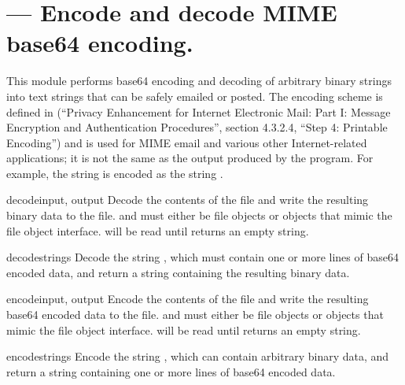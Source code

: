 \section{ ---
         Encode and decode MIME base64 encoding.}



This module performs base64 encoding and decoding of arbitrary binary
strings into text strings that can be safely emailed or posted.  The
encoding scheme is defined in  (``Privacy Enhancement for
Internet Electronic Mail: Part I: Message Encryption and
Authentication Procedures'', section 4.3.2.4, ``Step 4: Printable
Encoding'') and is used for MIME email and
various other Internet-related applications; it is not the same as the
output produced by the  program.  For example, the
string  is encoded as the string
.  


\begin{funcdesc}{decode}{input, output}
Decode the contents of the  file and write the resulting
binary data to the  file.
 and  must either be file objects or objects that
mimic the file object interface.  will be read until
 returns an empty string.
\end{funcdesc}

\begin{funcdesc}{decodestring}{s}
Decode the string , which must contain one or more lines of
base64 encoded data, and return a string containing the resulting
binary data.
\end{funcdesc}

\begin{funcdesc}{encode}{input, output}
Encode the contents of the  file and write the resulting
base64 encoded data to the  file.
 and  must either be file objects or objects that
mimic the file object interface.  will be read until
 returns an empty string.
\end{funcdesc}

\begin{funcdesc}{encodestring}{s}
Encode the string , which can contain arbitrary binary data,
and return a string containing one or more lines of
base64 encoded data.
\end{funcdesc}
